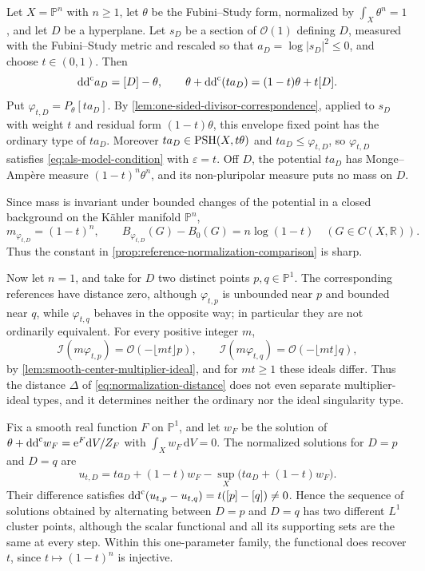 \begin{example}\label{ex:normalization-distance-projective}
Let $X=\mathbb P^n$ with $n\geq1$, let $\theta$ be the Fubini--Study form, normalized by $\int_X\theta^n=1$, and let $D$ be a hyperplane. Let $s_D$ be a section of $\mathcal O(1)$ defining $D$, measured with the Fubini--Study metric and rescaled so that $a_D=\log|s_D|^2\leq0$, and choose $t\in(0,1)$. Then
\[
 \mathrm{dd}^{\mathrm{c}} a_D=[D]-\theta,\qquad
 \theta+\mathrm{dd}^{\mathrm{c}}(ta_D)=(1-t)\theta+t[D].
\]
Put $\varphi_{t,D}=P_\theta[ta_D]$. By \cref{lem:one-sided-divisor-correspondence}, applied to $s_D$ with weight $t$ and residual form $(1-t)\theta$, this envelope fixed point has the ordinary type of $ta_D$. Moreover $ta_D\in\mathrm{PSH}(X,t\theta)$ and $ta_D\leq\varphi_{t,D}$, so $\varphi_{t,D}$ satisfies \eqref{eq:als-model-condition} with $\varepsilon=t$. Off $D$, the potential $ta_D$ has Monge--Amp\`ere measure $(1-t)^n\theta^n$, and its non-pluripolar measure puts no mass on $D$.

Since mass is invariant under bounded changes of the potential in a closed background on the K\"ahler manifold $\mathbb P^n$,
\[
 m_{\varphi_{t,D}}=(1-t)^n,\qquad
 B_{\varphi_{t,D}}(G)-B_0(G)=n\log(1-t)\quad(G\in C(X,\mathbb R)).
\]
Thus the constant in \cref{prop:reference-normalization-comparison} is sharp.

Now let $n=1$, and take for $D$ two distinct points $p,q\in\mathbb P^1$. The corresponding references have distance zero, although $\varphi_{t,p}$ is unbounded near $p$ and bounded near $q$, while $\varphi_{t,q}$ behaves in the opposite way; in particular they are not ordinarily equivalent. For every positive integer $m$,
\[
 \mathcal I(m\varphi_{t,p})=\mathcal O(-\lfloor mt\rfloor p),\qquad
 \mathcal I(m\varphi_{t,q})=\mathcal O(-\lfloor mt\rfloor q),
\]
by \cref{lem:smooth-center-multiplier-ideal}, and for $mt\geq1$ these ideals differ. Thus the distance $\Delta$ of \eqref{eq:normalization-distance} does not even separate multiplier-ideal types, and it determines neither the ordinary nor the ideal singularity type.

Fix a smooth real function $F$ on $\mathbb P^1$, and let $w_F$ be the solution of $\theta+\mathrm{dd}^{\mathrm{c}} w_F=\mathrm{e}^F\mathrm{d}V/Z_F$ with $\int_Xw_F\,\mathrm{d}V=0$. The normalized solutions for $D=p$ and $D=q$ are
\[
 u_{t,D}=ta_D+(1-t)w_F-\sup_X\bigl(ta_D+(1-t)w_F\bigr).
\]
Their difference satisfies $\mathrm{dd}^{\mathrm{c}}(u_{t,p}-u_{t,q})=t([p]-[q])\ne0$. Hence the sequence of solutions obtained by alternating between $D=p$ and $D=q$ has two different $L^1$ cluster points, although the scalar functional and all its supporting sets are the same at every step. Within this one-parameter family, the functional does recover $t$, since $t\mapsto(1-t)^n$ is injective.
\end{example}

